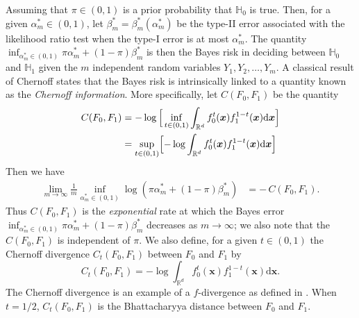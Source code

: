 \documentclass[10pt]{article}
\begin{document}
Assuming that $\pi \in (0,1)$ is a prior probability that $\mathbb{H}_0$ is true. Then, for a given $\alpha_m^{*} \in (0,1)$, let $\beta_m^{*} = \beta_m^{*}(\alpha_m^{*})$ be the type-II error associated with the likelihood ratio test when the type-I error is at most $\alpha_m^{*}$. The quantity $\inf_{\alpha_m^{*} \in (0,1)} \pi \alpha_m^{*} + (1 - \pi) \beta_m^{*}$ is then the Bayes risk in deciding between $\mathbb{H}_0$ and $\mathbb{H}_1$ given the $m$ independent random variables $Y_1, Y_2, \dots, Y_m$. A classical result of Chernoff \cite{chernoff_1952} states that the Bayes risk is intrinsically linked to a quantity known as the {\em Chernoff information}. More specifically, let $C(F_0, F_1)$ be the quantity
\begin{equation}
\label{eq:chernoff-defn}
\begin{split} C(F_0, F_1) & = - \log \, \Bigl[\, \inf_{t \in (0,1)} \int_{\mathbb{R}^{d}} f_0^{t}(\bm{x}) f_1^{1-t}(\bm{x}) \mathrm{d}\bm{x} \Bigr] \\
&= \sup_{t \in (0,1)} \Bigl[ - \log \int_{\mathbb{R}^{d}} f_0^{t}(\bm{x}) f_1^{1-t}(\bm{x}) \mathrm{d}\bm{x} \Bigr]
\end{split}
\end{equation}
Then we have
\begin{equation}
\label{eq:chernoff-binary}
\begin{split}
\lim_{m \rightarrow \infty} \frac{1}{m} \inf_{\alpha_m^{*} \in (0,1)} \log( \pi \alpha_m^{*} + (1 - \pi) \beta_m^{*}) & = - \, C(F_0, F_1).
\end{split}
\end{equation}
Thus $C(F_0, F_1)$ is the {\em exponential} rate at which the Bayes error $\inf_{\alpha_m^{*} \in (0,1)} \pi \alpha_m^{*} + (1 - \pi) \beta_m^{*}$ decreases as $m \rightarrow \infty$; we also note that the $C(F_0, F_1)$ is independent of $\pi$. We also define, for a given $t \in (0,1)$ the Chernoff divergence $C_t(F_0, F_1) $ between $F_0$ and $F_1$ by
$$ C_{t}(F_0,F_1) = - \log \int_{\mathbb{R}^{d}} f_0^{t}(\bm{x}) f_1^{1-t}(\bm{x}) \mathrm{d}\bm{x}. $$
The Chernoff divergence is an example of a $f$-divergence as defined in \cite{Csizar}. When $t = 1/2$, $C_t(F_0,F_1)$ is the Bhattacharyya distance between $F_0$ and $F_1$. 
\end{document}

